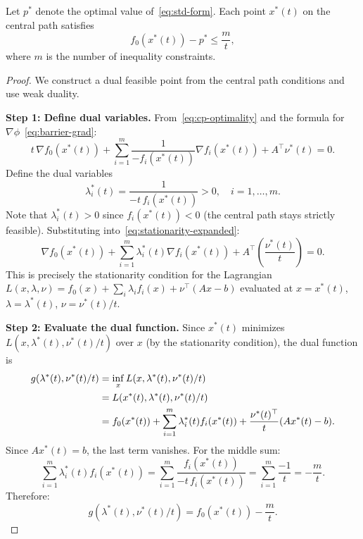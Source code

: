 \documentclass[11pt,a4paper]{article}
\begin{document}
\begin{theorem}\label{thm:central-path}
Let $p^*$ denote the optimal value of~\eqref{eq:std-form}. Each point
$x^*(t)$ on the central path satisfies
\begin{equation}\label{eq:central-bound}
  \boxed{f_0(x^*(t)) - p^* \le \frac{m}{t},}
\end{equation}
where $m$ is the number of inequality constraints.
\end{theorem}

\begin{proof}
We construct a dual feasible point from the central path conditions
and use weak duality.

\textbf{Step 1: Define dual variables.}
From~\eqref{eq:cp-optimality} and the formula for
$\nabla\phi$~\eqref{eq:barrier-grad}:
\begin{equation}\label{eq:stationarity-expanded}
  t\,\nabla f_0(x^*(t))
  + \sum_{i=1}^m \frac{1}{-f_i(x^*(t))}\nabla f_i(x^*(t))
  + A^\top\nu^*(t) = 0.
\end{equation}
Define the dual variables
\begin{equation}\label{eq:dual-vars}
  \lambda_i^*(t) = \frac{1}{-t\,f_i(x^*(t))} > 0,
  \quad i = 1, \dots, m.
\end{equation}
Note that $\lambda_i^*(t) > 0$ since $f_i(x^*(t)) < 0$ (the central
path stays strictly feasible). Substituting into~\eqref{eq:stationarity-expanded}:
\begin{equation}\label{eq:stationarity-dual}
  \nabla f_0(x^*(t)) + \sum_{i=1}^m \lambda_i^*(t)\nabla f_i(x^*(t))
  + A^\top\!\left(\frac{\nu^*(t)}{t}\right) = 0.
\end{equation}
This is precisely the stationarity condition for the Lagrangian
$L(x, \lambda, \nu) = f_0(x) + \sum_i \lambda_i f_i(x) + \nu^\top(Ax - b)$
evaluated at $x = x^*(t)$, $\lambda = \lambda^*(t)$,
$\nu = \nu^*(t)/t$.

\textbf{Step 2: Evaluate the dual function.}
Since $x^*(t)$ minimizes $L(x, \lambda^*(t), \nu^*(t)/t)$ over $x$
(by the stationarity condition), the dual function is
\begin{align}
  g(\lambda^*(t), \nu^*(t)/t)
  &= \inf_x L(x, \lambda^*(t), \nu^*(t)/t) \notag \\
  &= L(x^*(t), \lambda^*(t), \nu^*(t)/t) \notag \\
  &= f_0(x^*(t)) + \sum_{i=1}^m \lambda_i^*(t) f_i(x^*(t))
    + \frac{\nu^*(t)^\top}{t}(Ax^*(t) - b). \label{eq:dual-eval}
\end{align}
Since $Ax^*(t) = b$, the last term vanishes. For the middle sum:
\begin{equation}\label{eq:complementarity}
  \sum_{i=1}^m \lambda_i^*(t) f_i(x^*(t))
  = \sum_{i=1}^m \frac{f_i(x^*(t))}{-t\,f_i(x^*(t))}
  = \sum_{i=1}^m \frac{-1}{t} = -\frac{m}{t}.
\end{equation}
Therefore:
\begin{equation}\label{eq:dual-value}
  g(\lambda^*(t), \nu^*(t)/t) = f_0(x^*(t)) - \frac{m}{t}.
\end{equation}


\end{proof}
\end{document}
